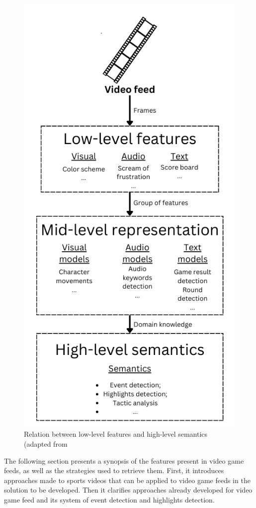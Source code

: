     \begin{figure}[htbp]
        \centering
        \includegraphics[width=0.7\linewidth]{Chapters/Figures/Relationship_Events.png}
        \caption{Relation between low-level features and high-level semantics (adapted from \cite{AutomaticEventDetectionTennis}}
        \label{fig:LLF_HLS_realtion}
    \end{figure}

    The following section presents a synopsis of the features present in video game feeds, as well as the strategies used to retrieve them. First, it introduces approaches made to sports videos that can be applied to video game feeds in the solution to be developed. Then it clarifies approaches already developed for video game feed and its system of event detection and highlights detection.

% 

